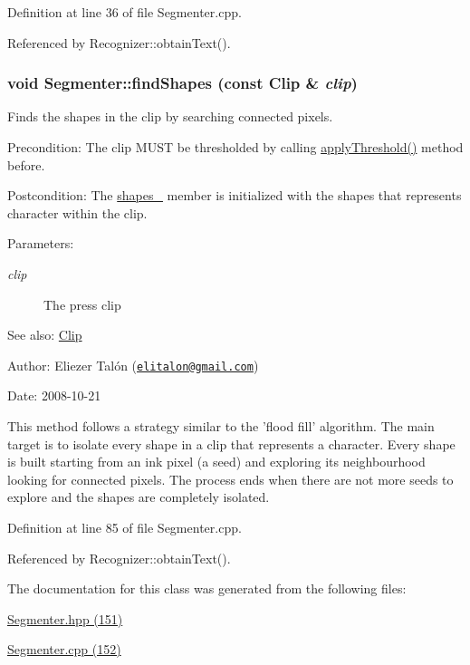 Definition at line 36 of file Segmenter.cpp.

Referenced by Recognizer::obtainText().\hypertarget{class_segmenter_465c8e755bb56d247add080a04377520}{
\subsubsection[findShapes]{\setlength{\rightskip}{0pt plus 5cm}void Segmenter::findShapes (const {\bf Clip} \& {\em clip})}}
\label{class_segmenter_465c8e755bb56d247add080a04377520}


Finds the shapes in the clip by searching connected pixels. 

\begin{Desc}
\item[Precondition:]The clip MUST be thresholded by calling \hyperlink{class_segmenter_6854315e3320f9d9a8ece14cbb8570ee}{applyThreshold()} method before.\end{Desc}
\begin{Desc}
\item[Postcondition:]The \hyperlink{class_segmenter_3040cc000907ef44e820ddcf70de6f08}{shapes\_\-} member is initialized with the shapes that represents character within the clip.\end{Desc}
\begin{Desc}
\item[Parameters:]
\begin{description}
\item[{\em clip}]The press clip\end{description}
\end{Desc}
\begin{Desc}
\item[See also:]\hyperlink{class_clip}{Clip}\end{Desc}
\begin{Desc}
\item[Author:]Eliezer Talón (\href{mailto:elitalon@gmail.com}{\tt elitalon@gmail.com}) \end{Desc}
\begin{Desc}
\item[Date:]2008-10-21\end{Desc}
This method follows a strategy similar to the 'flood fill' algorithm. The main target is to isolate every shape in a clip that represents a character. Every shape is built starting from an ink pixel (a seed) and exploring its neighbourhood looking for connected pixels. The process ends when there are not more seeds to explore and the shapes are completely isolated. 

Definition at line 85 of file Segmenter.cpp.

Referenced by Recognizer::obtainText().

The documentation for this class was generated from the following files:\begin{CompactItemize}
\item 
\hyperlink{_segmenter_8hpp}{Segmenter.hpp (151)}\item 
\hyperlink{_segmenter_8cpp}{Segmenter.cpp (152)}\end{CompactItemize}
